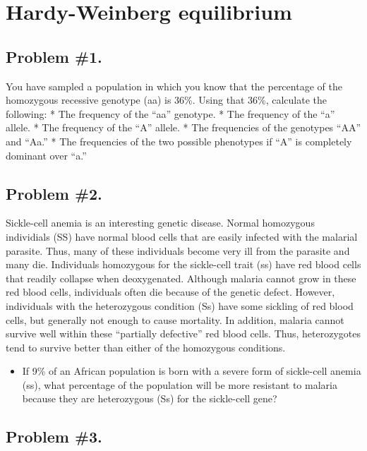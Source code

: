 \documentclass[
  a4paper]{book}
\providecommand{\tightlist}{%
  \setlength{\itemsep}{0pt}\setlength{\parskip}{0pt}}
\begin{document}
\hypertarget{hardy-weinberg-equilibrium}{%
\chapter{Hardy-Weinberg equilibrium}\label{hardy-weinberg-equilibrium}}

\hypertarget{problem-1.}{%
\section{Problem \#1.}\label{problem-1.}}

You have sampled a population in which you know that the percentage of
the homozygous recessive genotype (aa) is 36\%. Using that 36\%,
calculate the following: * The frequency of the ``aa'' genotype. * The
frequency of the ``a'' allele. * The frequency of the ``A'' allele. *
The frequencies of the genotypes ``AA'' and ``Aa.'' * The frequencies of
the two possible phenotypes if ``A'' is completely dominant over ``a.''

\hypertarget{problem-2.}{%
\section{Problem \#2.}\label{problem-2.}}

Sickle-cell anemia is an interesting genetic disease. Normal homozygous
individials (SS) have normal blood cells that are easily infected with
the malarial parasite. Thus, many of these individuals become very ill
from the parasite and many die. Individuals homozygous for the
sickle-cell trait (ss) have red blood cells that readily collapse when
deoxygenated. Although malaria cannot grow in these red blood cells,
individuals often die because of the genetic defect. However,
individuals with the heterozygous condition (Ss) have some sickling of
red blood cells, but generally not enough to cause mortality. In
addition, malaria cannot survive well within these ``partially
defective'' red blood cells. Thus, heterozygotes tend to survive better
than either of the homozygous conditions.

\begin{itemize}
\tightlist
\item
  If 9\% of an African population is born with a severe form of
  sickle-cell anemia (ss), what percentage of the population will be
  more resistant to malaria because they are heterozygous (Ss) for the
  sickle-cell gene?
\end{itemize}

\hypertarget{problem-3.}{%
\section{Problem \#3.}\label{problem-3.}}
\end{document}
